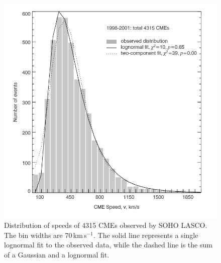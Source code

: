 \begin{figure}[!t]
\begin{center}
\includegraphics[scale=0.4, trim=0cm 1cm 0cm 1cm]{images/cme_speed_histo}
\caption[Distribution of CME speeds]{Distribution of speeds of 4315 CMEs observed by SOHO LASCO. The bin widths are 70\,km\,s$^{-1}$. The solid line represents a single lognormal fit to the observed data, while the dashed line is the sum of a Gaussian and a lognormal fit. \citep{yurch2005} }
\label{fig:yurch2005}
\end{center}
\end{figure}
